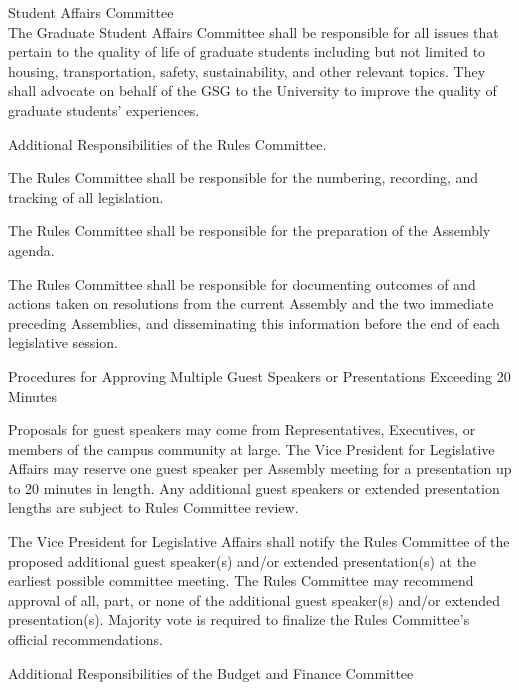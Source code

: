 \begin{bylaws-number}
\begin{bylaws-number}
  \item Student Affairs Committee \hfill \\
The Graduate Student Affairs Committee shall be responsible for all issues that pertain to the quality of life of graduate students including but not limited to housing, transportation, safety, sustainability, and other relevant topics. They shall advocate on behalf of the GSG to the University to improve the quality of graduate students’ experiences.
  \end{bylaws-number}
  \item Additional Responsibilities of the Rules Committee.
  \begin{bylaws-number}
    \item The Rules Committee shall be responsible for the numbering, recording, and tracking of all legislation.
    \item The Rules Committee shall be responsible for the preparation of the Assembly agenda.
    \item The Rules Committee shall be responsible for documenting outcomes of and actions taken on resolutions from the current Assembly and the two immediate preceding Assemblies, and disseminating this information before the end of each legislative session.
    \item Procedures for Approving Multiple Guest Speakers or Presentations Exceeding 20 Minutes
    \begin{bylaws-number}
    	\item Proposals for guest speakers may come from Representatives, Executives, or members of the campus community at large. The Vice President for Legislative Affairs may reserve one guest speaker per Assembly meeting for a presentation up to 20 minutes in length. Any additional guest speakers or extended presentation lengths are subject to Rules Committee review.
    	\item The Vice President for Legislative Affairs shall notify the Rules Committee of the proposed additional guest speaker(s) and/or extended presentation(s) at the earliest possible committee meeting. The Rules Committee may recommend approval of all, part, or none of the additional guest speaker(s) and/or extended presentation(s). Majority vote is required to finalize the Rules Committee’s official recommendations.
   	\end{bylaws-number}
  \end{bylaws-number}
  \item Additional Responsibilities of the Budget and Finance Committee

\end{bylaws-number}
